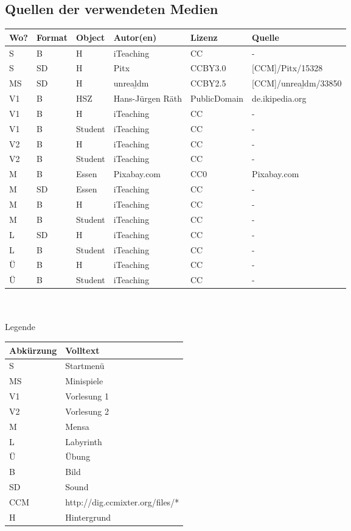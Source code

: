 \documentclass[a4paper, 11pt]{article} %
\begin{document}
\subsection{Quellen der verwendeten Medien}

\begin{tabular}{|lllllp{4.5cm}|}
\hline 
\textbf{Wo?} & \textbf{Format} & \textbf{Object} & \textbf{Autor(en)} & \textbf{Lizenz} & \textbf{Quelle} \\ 
\hline
S & B & H & iTeaching & CC & - \\ 
\hline
S & SD & H & Pitx & CCBY3.0 & [CCM]/Pitx/15328 \\ 
\hline
MS & SD & H & unreal\b{ }dm & CCBY2.5 & [CCM]/unreal\b{ }dm/33850 \\ 
\hline
V1 & B & HSZ & Hans-Jürgen Räth & PublicDomain & de.ikipedia.org \\
\hline
V1 & B & H & iTeaching & CC & - \\ 
\hline
V1 & B & Student & iTeaching & CC & - \\ 
\hline
V2 & B & H & iTeaching & CC & - \\ 
\hline
V2 & B & Student & iTeaching & CC & - \\ 
\hline
M & B & Essen & Pixabay.com & CC0 & Pixabay.com \\ 
\hline
M & SD & Essen & iTeaching & CC & - \\ 
\hline
M & B & H & iTeaching & CC & - \\ 
\hline
M & B & Student & iTeaching & CC & - \\ 
\hline
L& SD & H & iTeaching & CC & - \\ 
\hline
L& B & Student & iTeaching & CC & - \\ 
\hline
Ü& B & H & iTeaching & CC & - \\ 
\hline
Ü& B & Student & iTeaching & CC & - \\ 
\hline
\end{tabular} \\\\
Legende \\
\begin{tabular}{|lp{6cm}|}
\hline 
\textbf{Abkürzung} & \textbf{Volltext} \\
\hline 
S & Startmenü \\
MS & Minispiele \\
V1 & Vorlesung 1 \\
V2 & Vorlesung 2 \\
M & Mensa \\
L & Labyrinth \\
Ü & Übung \\
B & Bild \\
SD & Sound \\
CCM & http://dig.ccmixter.org/files/* \\
H & Hintergrund \\
\hline
\end{tabular}
\end{document}
